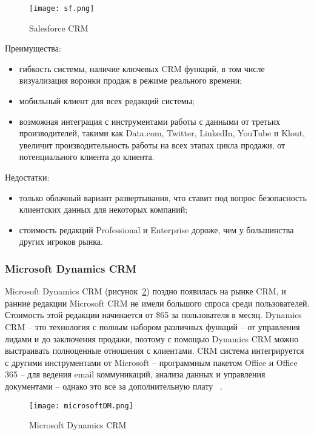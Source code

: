 \begin{figure}[h]
\centering
  \texttt{[image: sf.png]}  
  \caption{Salesforce CRM}
	\label{fig:sf}
\end{figure}

Преимущества: 
\begin{itemize}
\item гибкость системы, наличие ключевых CRM функций, в том числе визуализация воронки продаж в режиме реального времени;
\item мобильный клиент для всех редакций системы;
\item возможная интеграция с инструментами работы с данными от третьих производителей, такими как Data.com, Twitter, LinkedIn, YouTube и Klout, увеличит производительность работы на всех этапах цикла продажи, от потенциального клиента до клиента.
\end{itemize}

Недостатки: 
\begin{itemize}
\item только облачный вариант развертывания, что ставит под вопрос безопасность клиентских данных для некоторых компаний;
\item стоимость редакций Professional и Enterprise дороже, чем у большинства других игроков рынка.
\end{itemize}


\subsubsection{Microsoft Dynamics CRM }
\label{sub:alternatives:crm:msDM}
Microsoft Dynamics CRM (рисунок~\ref{fig:msDM}) поздно появилась на рынке CRM, и ранние редакции Microsoft CRM не имели большого спроса среди пользователей.  Стоимость этой редакции начинается от \$65 за пользователя в месяц. Dynamics CRM – это технология с полным набором различных функций -- от управления лидами и до заключения продажи, поэтому с помощью Dynamics CRM можно выстраивать полноценные отношения с клиентами. CRM система интегрируется с другими инструментами от Microsoft – программным пакетом Office и Office 365 -- для ведения email коммуникаций, анализа данных и управления документами – однако это все за дополнительную плату ~\cite{msdyn}.


\begin{figure}[h]
\centering
  \texttt{[image: microsoftDM.png]}  
  \caption{Microsoft Dynamics CRM}
  \label{fig:msDM}
\end{figure}

